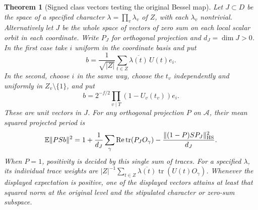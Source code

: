 \documentclass[a4paper,11pt]{article}
\newtheorem{theorem}[proposition]{Theorem}
\theoremstyle{definition}
\theoremstyle{remark}
\numberwithin{equation}{section}
\begin{document}
\begin{theorem}[Signed class vectors testing the original Bessel map]
\label{thm:dyad234}
Let \(J\subset D\) be the space of a specified character
\(\lambda=\prod_v\lambda_v\) of \(Z\), with each \(\lambda_v\)
nontrivial. Alternatively let \(J\) be the whole space of vectors
of zero sum on each local scalar orbit in each coordinate.
Write \(P_J\) for orthogonal projection and \(d_J=\dim J>0\).
In the first case take \(i\) uniform in the coordinate basis and put
\[
 b=\frac{1}{\sqrt{|Z|}}\sum_{t\in Z}\overline{\lambda(t)}\,U(t)e_i .
\]
In the second, choose \(i\) in the same way, choose the \(t_v\)
independently and uniformly in \(Z_v\setminus\{1\}\), and put
\[
             b=2^{-f/2}\prod_{v\mid T}(1-U_v(t_v))e_i .
\]
These are unit vectors in \(J\). For any orthogonal projection
\(P\) on \(\mathcal A\), their mean squared projected period is
\[
 \mathbb E\|PSb\|^2 =
   1+\frac{1}{d_J}\sum_\gamma
                 \operatorname{Re}\operatorname{tr}(P_J O_\gamma)
       -\frac{\|(1-P)SP_J\|_{\rm HS}^2}{d_J}.
\]
When \(P=1\), positivity is decided by this single sum of traces.
For a specified \(\lambda\), its individual trace weights are
\(|Z|^{-1}\sum_{t\in Z}\overline{\lambda(t)}
 \operatorname{tr}(U(t)O_\gamma)\).
Whenever the displayed expectation is positive, one of the
displayed vectors attains at least that squared norm at the
original level and the stipulated character or zero-sum subspace.
\end{theorem}
\end{document}
